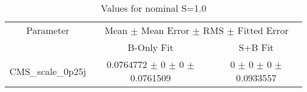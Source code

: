 \begin{table}
\centering
\caption{Values for nominal S=1.0}
\begin{tabular}{ccc}
\toprule
Parameter & \multicolumn{2}{c}{Mean $\pm$ Mean Error $\pm$ RMS $\pm$ Fitted Error}\\
 & B-Only Fit & S+B Fit\\
\midrule
CMS\_scale\_0p25j & \num{0.0764772} $\pm$ \num{0} $\pm$ \num{0} $\pm$ \num{0.0761509} & \num{0} $\pm$ \num{0} $\pm$ \num{0} $\pm$ \num{0.0933557}\\
\bottomrule
\end{tabular}
\end{table}